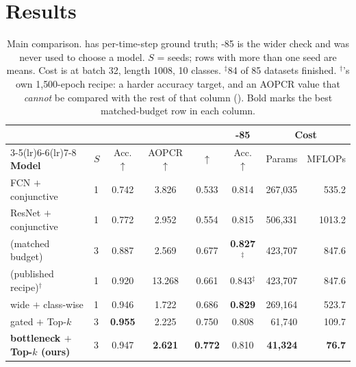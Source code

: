 %

\section{Results}
\label{sec:results}

\begin{table}[t]
\caption{Main comparison. \webtraffic{} has per-time-step ground truth; \ucr{}-85 is the wider check
and was never used to choose a model. $S$ = seeds; rows with more than one seed are means. Cost is at
batch 32, length 1008, 10 classes. $^{\ddagger}$84 of 85 datasets finished.
$^{\dagger}$\millet{}'s own 1{,}500-epoch recipe: a harder accuracy target, and an AOPCR value that
\emph{cannot} be compared with the rest of that column (). Bold marks the best
matched-budget row in each column.}
\label{tab:main}
\begin{center}
\footnotesize
\setlength{\tabcolsep}{3.2pt}
\begin{tabular}{llccccrr}
\toprule
& & \multicolumn{3}{c}{\webtraffic{}} & \ucr{}-85 & \multicolumn{2}{c}{Cost} \\
\cmidrule(lr){3-5}\cmidrule(lr){6-6}\cmidrule(lr){7-8}
\textbf{Model} & $S$ & Acc. $\uparrow$ & AOPCR $\uparrow$ & \ndcg{} $\uparrow$ & Acc. $\uparrow$ &
Params & MFLOPs \\
\midrule
FCN $+$ conjunctive           & 1 & 0.742 & 3.826 & 0.533 & 0.814 & 267{,}035 & 535.2 \\
ResNet $+$ conjunctive        & 1 & 0.772 & 2.952 & 0.554 & 0.815 & 506{,}331 & 1013.2 \\
\millet{} (matched budget)    & 3 & 0.887 & 2.569 & 0.677 & \textbf{0.827}$^{\ddagger}$ & 423{,}707 & 847.6 \\
\millet{} (published recipe)$^{\dagger}$ & 1 & 0.920 & 13.268 & 0.661 & 0.843$^{\ddagger}$ & 423{,}707 & 847.6 \\
\midrule
\seanet{} wide $+$ class-wise & 1 & 0.946 & 1.722 & 0.686 & \textbf{0.829} & 269{,}164 & 523.7 \\
\seanet{} gated $+$ Top-$k$   & 3 & \textbf{0.955} & 2.225 & 0.750 & 0.808 & 61{,}740 & 109.7 \\
\textbf{\seanet{} bottleneck $+$ Top-$k$ (ours)}
                              & 3 & 0.947 & \textbf{2.621} & \textbf{0.772} & 0.810 & \textbf{41{,}324} & \textbf{76.7} \\
\bottomrule
\end{tabular}
\end{center}
\end{table}

